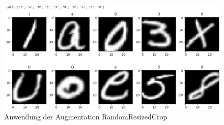 \documentclass[12pt,oneside]{article}
\begin{document}
  \begin{figure}[h!]
  	\centering
  	\includegraphics[width=0.7\linewidth]{Bilder/Augmentation_RandomResizedCrop.png}
  	\caption[Anwendung der Augmentation RandomResizedCrop]{Anwendung der Augmentation RandomResizedCrop}
  	\label{fig:Augment_RandomResizedCrop}
  \end{figure}
  

  \clearpage %
\end{document}
